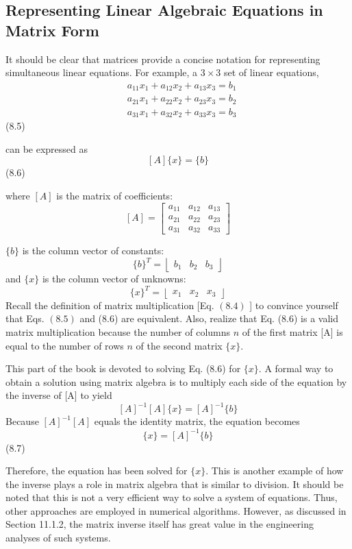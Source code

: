 \documentclass[../main.tex]{subfiles}
\begin{document}
\subsection{Representing Linear Algebraic Equations in Matrix Form}

\noindent It should be clear that matrices provide a concise notation for representing simultaneous linear equations. For example, a $3 \times 3$ set of linear equations,
$$
\begin{aligned}
&a_{11} x_{1}+a_{12} x_{2}+a_{13} x_{3}=b_{1} \\
&a_{21} x_{1}+a_{22} x_{2}+a_{23} x_{3}=b_{2} \\
&a_{31} x_{1}+a_{32} x_{2}+a_{33} x_{3}=b_{3}
\end{aligned}
$$\hfill{(8.5)}

can be expressed as
$$
[A]\{x\}=\{b\}
$$\hfill{(8.6)}

where $[A]$ is the matrix of coefficients:
$$
[A]=\left[\begin{array}{lll}
a_{11} & a_{12} & a_{13} \\
a_{21} & a_{22} & a_{23} \\
a_{31} & a_{32} & a_{33}
\end{array}\right]
$$


\noindent $\{b\}$ is the column vector of constants:
$$
\{b\}^{T}=\left\lfloor\begin{array}{lll}
b_{1} & b_{2} & b_{3}
\end{array}\right\rfloor
$$
and $\{x\}$ is the column vector of unknowns:
$$
\{x\}^{T}=\left\lfloor\begin{array}{lll}
x_{1} & x_{2} & x_{3}
\end{array}\right\rfloor
$$
Recall the definition of matrix multiplication [Eq. $(8.4)$ ] to convince yourself that Eqs. $(8.5)$ and (8.6) are equivalent. Also, realize that Eq. (8.6) is a valid matrix multiplication because the number of columns $n$ of the first matrix [A] is equal to the number of rows $n$ of the second matrix $\{x\}$.

This part of the book is devoted to solving Eq. (8.6) for $\{x\}$. A formal way to obtain a solution using matrix algebra is to multiply each side of the equation by the inverse of [A] to yield
$$
[A]^{-1}[A]\{x\}=[A]^{-1}\{b\}
$$
Because $[A]^{-1}[A]$ equals the identity matrix, the equation becomes
$$
\{x\}=[A]^{-1}\{b\}
$$\hfill{(8.7)}

Therefore, the equation has been solved for $\{x\}$. This is another example of how the inverse plays a role in matrix algebra that is similar to division. It should be noted that this is not a very efficient way to solve a system of equations. Thus, other approaches are employed in numerical algorithms. However, as discussed in Section 11.1.2, the matrix inverse itself has great value in the engineering analyses of such systems.
\end{document}
